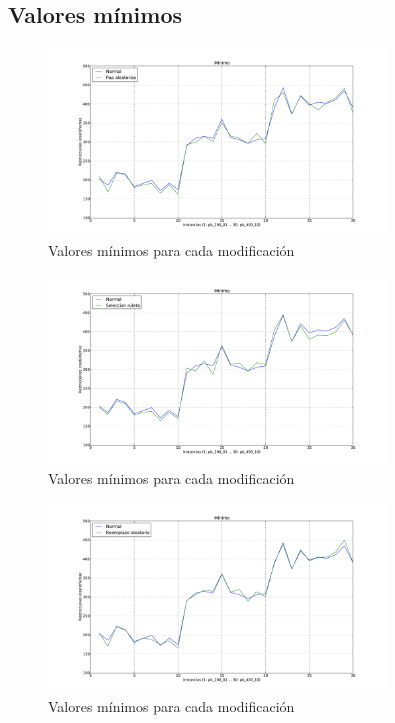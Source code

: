 \newpage

\subsection{Valores mínimos}

\begin{figure}[h!]
\begin{center}
\includegraphics[width=0.8\textwidth]{img/min-1.pdf}
\end{center}
\caption{Valores mínimos para cada modificación}
\label{fig:min-1}
\end{figure}

\begin{figure}[h!]
\begin{center}
\includegraphics[width=0.8\textwidth]{img/min-2.pdf}
\end{center}
\caption{Valores mínimos para cada modificación}
\label{fig:min-2}
\end{figure}

\begin{figure}[h!]
\begin{center}
\includegraphics[width=0.8\textwidth]{img/min-3.pdf}
\end{center}
\caption{Valores mínimos para cada modificación}
\label{fig:min-3}
\end{figure}

